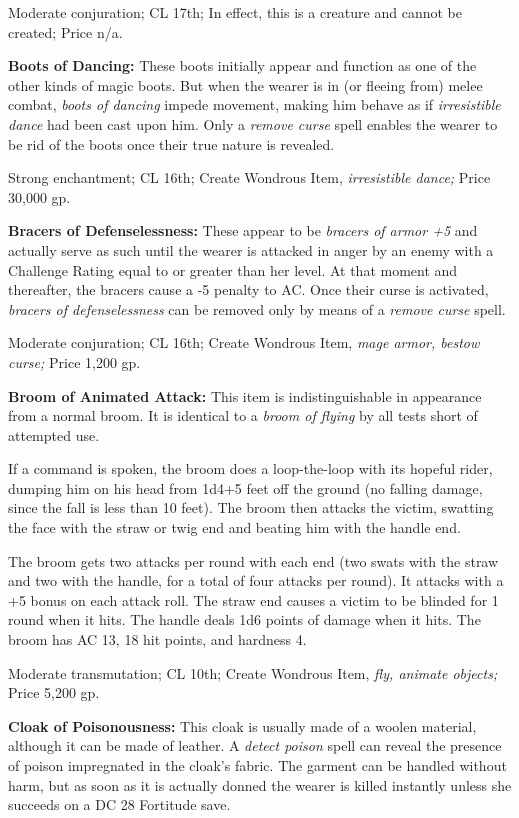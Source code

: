 Moderate conjuration; CL 17th; In effect, this is a creature and cannot be created; 
Price n/a.

\textbf{Boots of Dancing:} These boots initially appear and function as one of 
the other kinds of magic boots. But when the wearer is in (or fleeing from) melee 
combat, \textit{boots of dancing }impede movement, making him behave as if \textit{irresistible 
dance }had been cast upon him. Only a \textit{remove curse }spell enables the wearer 
to be rid of the boots once their true nature is revealed.

Strong enchantment; CL 16th; Create Wondrous Item, \textit{irresistible dance; 
}Price 30,000 gp.

\textbf{Bracers of Defenselessness: }These appear to be \textit{bracers of armor 
+5 }and actually serve as such until the wearer is attacked in anger by an enemy 
with a Challenge Rating equal to or greater than her level. At that moment and 
thereafter, the bracers cause a -5 penalty to AC. Once their curse is activated, 
\textit{bracers of defenselessness }can be removed only by means of a \textit{remove 
curse }spell.

Moderate conjuration; CL 16th; Create Wondrous Item, \textit{mage armor, bestow 
curse; }Price 1,200 gp.

\textbf{Broom of Animated Attack:} This item is indistinguishable in appearance 
from a normal broom. It is identical to a \textit{broom of flying }by all tests 
short of attempted use.

If a command is spoken, the broom does a loop-the-loop with its hopeful rider, 
dumping him on his head from 1d4+5 feet off the ground (no falling damage, since 
the fall is less than 10 feet). The broom then attacks the victim, swatting the 
face with the straw or twig end and beating him with the handle end.

The broom gets two attacks per round with each end (two swats with the straw and 
two with the handle, for a total of four attacks per round). It attacks with a 
+5 bonus on each attack roll. The straw end causes a victim to be blinded for 1 
round when it hits. The handle deals 1d6 points of damage when it hits. The broom 
has AC 13, 18 hit points, and hardness 4.

Moderate transmutation; CL 10th; Create Wondrous Item, \textit{fly, animate objects; 
}Price 5,200 gp.

\textbf{Cloak of Poisonousness:} This cloak is usually made of a woolen material, 
although it can be made of leather. A \textit{detect poison }spell can reveal the 
presence of poison impregnated in the cloak's fabric. The garment can be handled 
without harm, but as soon as it is actually donned the wearer is killed instantly 
unless she succeeds on a DC 28 Fortitude save.

